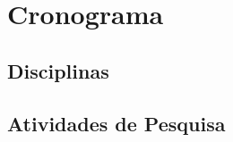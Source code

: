 \documentclass[12pt, a4paper]{article}
\numberwithin{table}{section}
\begin{document}
\section{Cronograma}
\label{sec:cronograma}
\subsection{Disciplinas}
\subsection{Atividades de Pesquisa}



\renewcommand\refname{Referências Bibliográficas}
%


\end{document}
